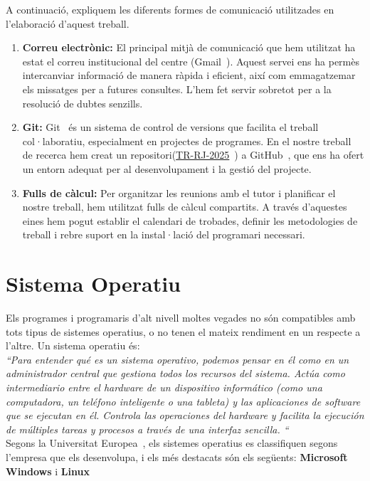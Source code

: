 A continuació, expliquem les diferents formes de comunicació utilitzades en l'elaboració d'aquest treball.
\begin{enumerate}
\item \textbf{Correu electrònic:} El principal mitjà de comunicació que hem utilitzat ha estat el correu institucional del centre (Gmail~\cite{Gmail}). Aquest servei ens ha permès intercanviar informació de manera ràpida i eficient, així com emmagatzemar els missatges per a futures consultes. L’hem fet servir sobretot per a la resolució de dubtes senzills.

\item \textbf{Git:} Git~\cite{git} és un sistema de control de versions que facilita el treball col·laboratiu, especialment en projectes de programes. En el nostre treball de recerca hem creat un repositori(\href{https://github.com/Rui564/TR-RJ-2025}{TR-RJ-2025}~\cite{TR-RJ-2025}) a GitHub~\cite{GitHub}, que ens ha ofert un entorn adequat per al desenvolupament i la gestió del projecte.

\item \textbf{Fulls de càlcul:} Per organitzar les reunions amb el tutor i planificar el nostre treball, hem utilitzat fulls de càlcul \cite{FullDeCàlcul} compartits. A través d’aquestes eines hem pogut establir el calendari de trobades, definir les metodologies de treball i rebre suport en la instal·lació del programari necessari.
\end{enumerate}

\section{Sistema Operatiu}
Els programes i programaris d'alt nivell moltes vegades no són compatibles amb tots tipus de sistemes operatius, o no tenen el mateix rendiment en un respecte a l'altre. %
Un sistema operatiu és:\\
\textit{``Para entender qué es un sistema operativo, podemos pensar en él como en un administrador central que gestiona todos los recursos del sistema. Actúa como intermediario entre el hardware de un dispositivo informático (como una computadora, un teléfono inteligente o una tableta) y las aplicaciones de software que se ejecutan en él. Controla las operaciones del hardware y facilita la ejecución de múltiples tareas y procesos a través de una interfaz sencilla. ``}\\
 Segons la Universitat Europea~\cite{UniversitatEuropea}, els sistemes operatius es classifiquen segons l’empresa que els desenvolupa, i els més destacats són els següents: \textbf{Microsoft Windows} i \textbf{Linux}

